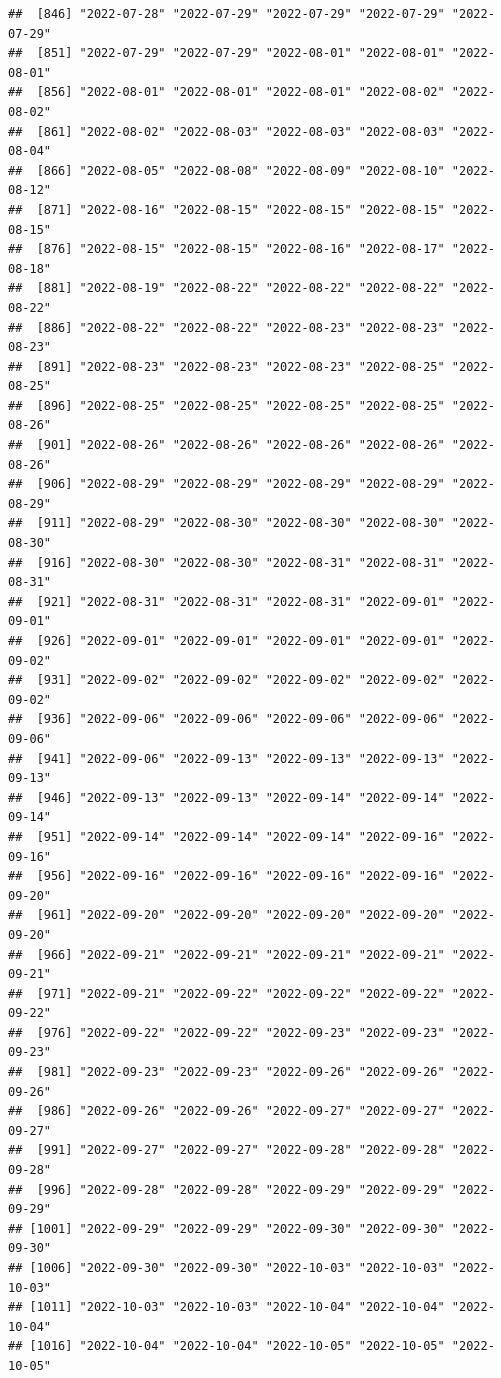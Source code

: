 \documentclass[
]{article}
\begin{document}
\begin{verbatim}
##  [846] "2022-07-28" "2022-07-29" "2022-07-29" "2022-07-29" "2022-07-29"
##  [851] "2022-07-29" "2022-07-29" "2022-08-01" "2022-08-01" "2022-08-01"
##  [856] "2022-08-01" "2022-08-01" "2022-08-01" "2022-08-02" "2022-08-02"
##  [861] "2022-08-02" "2022-08-03" "2022-08-03" "2022-08-03" "2022-08-04"
##  [866] "2022-08-05" "2022-08-08" "2022-08-09" "2022-08-10" "2022-08-12"
##  [871] "2022-08-16" "2022-08-15" "2022-08-15" "2022-08-15" "2022-08-15"
##  [876] "2022-08-15" "2022-08-15" "2022-08-16" "2022-08-17" "2022-08-18"
##  [881] "2022-08-19" "2022-08-22" "2022-08-22" "2022-08-22" "2022-08-22"
##  [886] "2022-08-22" "2022-08-22" "2022-08-23" "2022-08-23" "2022-08-23"
##  [891] "2022-08-23" "2022-08-23" "2022-08-23" "2022-08-25" "2022-08-25"
##  [896] "2022-08-25" "2022-08-25" "2022-08-25" "2022-08-25" "2022-08-26"
##  [901] "2022-08-26" "2022-08-26" "2022-08-26" "2022-08-26" "2022-08-26"
##  [906] "2022-08-29" "2022-08-29" "2022-08-29" "2022-08-29" "2022-08-29"
##  [911] "2022-08-29" "2022-08-30" "2022-08-30" "2022-08-30" "2022-08-30"
##  [916] "2022-08-30" "2022-08-30" "2022-08-31" "2022-08-31" "2022-08-31"
##  [921] "2022-08-31" "2022-08-31" "2022-08-31" "2022-09-01" "2022-09-01"
##  [926] "2022-09-01" "2022-09-01" "2022-09-01" "2022-09-01" "2022-09-02"
##  [931] "2022-09-02" "2022-09-02" "2022-09-02" "2022-09-02" "2022-09-02"
##  [936] "2022-09-06" "2022-09-06" "2022-09-06" "2022-09-06" "2022-09-06"
##  [941] "2022-09-06" "2022-09-13" "2022-09-13" "2022-09-13" "2022-09-13"
##  [946] "2022-09-13" "2022-09-13" "2022-09-14" "2022-09-14" "2022-09-14"
##  [951] "2022-09-14" "2022-09-14" "2022-09-14" "2022-09-16" "2022-09-16"
##  [956] "2022-09-16" "2022-09-16" "2022-09-16" "2022-09-16" "2022-09-20"
##  [961] "2022-09-20" "2022-09-20" "2022-09-20" "2022-09-20" "2022-09-20"
##  [966] "2022-09-21" "2022-09-21" "2022-09-21" "2022-09-21" "2022-09-21"
##  [971] "2022-09-21" "2022-09-22" "2022-09-22" "2022-09-22" "2022-09-22"
##  [976] "2022-09-22" "2022-09-22" "2022-09-23" "2022-09-23" "2022-09-23"
##  [981] "2022-09-23" "2022-09-23" "2022-09-26" "2022-09-26" "2022-09-26"
##  [986] "2022-09-26" "2022-09-26" "2022-09-27" "2022-09-27" "2022-09-27"
##  [991] "2022-09-27" "2022-09-27" "2022-09-28" "2022-09-28" "2022-09-28"
##  [996] "2022-09-28" "2022-09-28" "2022-09-29" "2022-09-29" "2022-09-29"
## [1001] "2022-09-29" "2022-09-29" "2022-09-30" "2022-09-30" "2022-09-30"
## [1006] "2022-09-30" "2022-09-30" "2022-10-03" "2022-10-03" "2022-10-03"
## [1011] "2022-10-03" "2022-10-03" "2022-10-04" "2022-10-04" "2022-10-04"
## [1016] "2022-10-04" "2022-10-04" "2022-10-05" "2022-10-05" "2022-10-05"

\end{verbatim}
\end{document}
